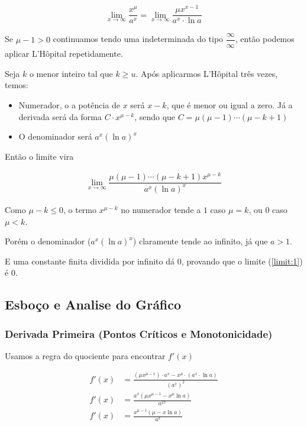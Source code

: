 \documentclass[../resumo.tex]{subfiles}
\begin{document}
	\begin{align*}
		\lim_{x \to \infty} \dfrac{x^\mu}{a^x} = \lim_{x \to \infty} \dfrac{\mu x^{x-1}}{a^x \cdot \ln a}
	\end{align*}

	Se $\mu-1 > 0$ continuamos tendo uma indeterminada do tipo $\dfrac{\infty}{\infty}$, então podemos
	aplicar L'Hôpital repetidamente.
	
	Seja $k$ o menor inteiro tal que $k \geq u$. Após aplicarmos L'Hôpital três vezes, temos:

	\begin{itemize}
		\item Numerador, o a potência de $x$ será $x - k$, que é menor ou igual a zero. Já a derivada será 
			da forma $C \cdot x^{\mu-k}$, sendo que $C = \mu(\mu-1)\cdots(\mu-k+1)$
		\item O denominador será $a^x (\ln a)^x$
	\end{itemize}

	Então o limite vira

	\begin{align*}
		\lim_{x \to \infty} \dfrac{\mu(\mu-1)\cdots(\mu-k+1)x^{\mu-k}}{a^x (\ln a)^x}
	\end{align*}

	Como $\mu - k \leq 0$, o termo $x^{\mu-k}$ no numerador tende a $1$ caso $\mu=k$, ou $0$ caso $\mu < k$.

	Porém o denominador ($a^x (\ln a)^x$) claramente tende ao infinito, já que $a > 1$.

	E uma constante finita dividida por infinito dá $0$, provando que o limite (\ref{limit:1}) é $0$.

	\subsection{Esboço e Analise do Gráfico}

	\subsubsection{Derivada Primeira (Pontos Críticos e Monotonicidade)}

	Usamos a regra do quociente para encontrar $f'(x)$

	\begin{align*}
		f'(x) &= \frac{(\mu x^{\mu-1}) \cdot a^{x} - x^{\mu} \cdot (a^x \cdot \ln a)}{(a^x)^2} \\
		f'(x) &= \frac{a^x (\mu x^{\mu-1} - x^\mu \ln a)}{a^{2x}} \\
		f'(x) &= \frac{x^{\mu-1}(\mu-x \ln a)}{a^x}
	\end{align*}
\end{document}
